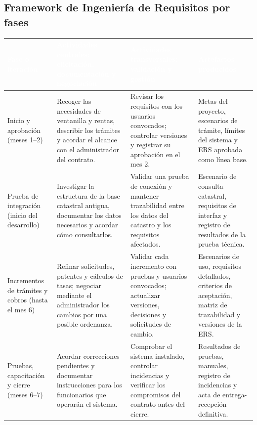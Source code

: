 \subsection{Framework de Ingeniería de Requisitos por fases}

\begin{center}
\small
\begin{tabularx}{\textwidth}{|L|L|L|L|}
\hline
{}
\textcolor{white}{\textbf{Fase o iteración}} &
\textcolor{white}{\textbf{Actividades centrales: elicitación, documentación y negociación}} &
\textcolor{white}{\textbf{Actividades transversales: validación y gestión}} &
\textcolor{white}{\textbf{Artefactos producidos}} \\ \hline
Inicio y aprobación (meses 1--2) &
Recoger las necesidades de ventanilla y rentas, describir los trámites y acordar el alcance con el administrador del contrato. &
Revisar los requisitos con los usuarios convocados; controlar versiones y registrar su aprobación en el mes 2. &
Metas del proyecto, escenarios de trámite, límites del sistema y ERS aprobada como línea base. \\ \hline
Prueba de integración (inicio del desarrollo) &
Investigar la estructura de la base catastral antigua, documentar los datos necesarios y acordar cómo consultarlos. &
Validar una prueba de conexión y mantener trazabilidad entre los datos del catastro y los requisitos afectados. &
Escenario de consulta catastral, requisitos de interfaz y registro de resultados de la prueba técnica. \\ \hline
Incrementos de trámites y cobros (hasta el mes 6) &
Refinar solicitudes, patentes y cálculos de tasas; negociar mediante el administrador los cambios por una posible ordenanza. &
Validar cada incremento con pruebas y usuarios convocados; actualizar versiones, decisiones y solicitudes de cambio. &
Escenarios de uso, requisitos detallados, criterios de aceptación, matriz de trazabilidad y versiones de la ERS. \\ \hline
Pruebas, capacitación y cierre (meses 6--7) &
Acordar correcciones pendientes y documentar instrucciones para los funcionarios que operarán el sistema. &
Comprobar el sistema instalado, controlar incidencias y verificar los compromisos del contrato antes del cierre. &
Resultados de pruebas, manuales, registro de incidencias y acta de entrega-recepción definitiva. \\ \hline
\end{tabularx}
\end{center}
